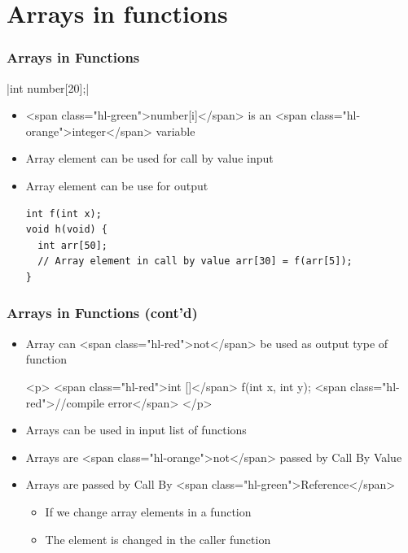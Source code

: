 \documentclass{../c-lecture}
\begin{document}
\section{Arrays in functions}

\begin{frame}[fragile]
  \frametitle{Arrays in Functions}
  |int number[20];|
  \begin{itemize}
    \item
      <span class="hl-green">number[i]</span> is an
      <span class="hl-orange">integer</span> variable

    \item Array element can be used for call by value input
    \item Array element can be use for output
    \begin{verbatim}
int f(int x);
void h(void) {
  int arr[50];
  // Array element in call by value arr[30] = f(arr[5]);
}
    \end{verbatim}
  \end{itemize}
\end{frame}

\begin{frame}
  \frametitle{Arrays in Functions (cont’d)}
  \begin{itemize}
    \item
      Array can <span class="hl-red">not</span> be used as output type of
      function

    <p>
      <span class="hl-red">int []</span> f(int x, int y);
      <span class="hl-red">//compile error</span>
    </p>
    \item Arrays can be used in input list of functions
    \item
      Arrays are <span class="hl-orange">not</span> passed by Call By Value

    \item
      Arrays are passed by Call By <span class="hl-green">Reference</span>

    \begin{itemize}
      \item If we change array elements in a function
      \item The element is changed in the caller function
    \end{itemize}
  \end{itemize}
\end{frame}
\end{document}
